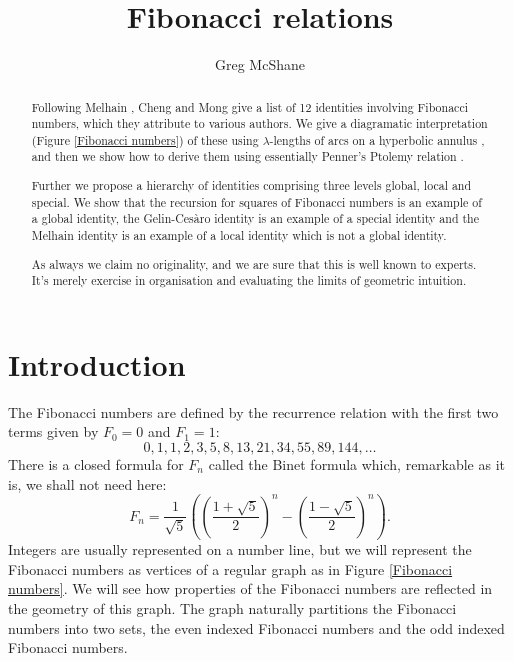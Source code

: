 \documentclass[12pt,a4paper]{amsart}
\title{Fibonacci relations}
\author[McShane]{Greg McShane}
\begin{document}
\maketitle

\begin{abstract} 


	Following Melhain \cite{melhain} , Cheng and Mong \cite{mong}
	give a list of 12 identities involving Fibonacci numbers,
	which they attribute to various authors. We give a
	diagramatic interpretation (Figure \ref{Fibonacci
	numbers}) of these using $\lambda$-lengths of arcs on a
	hyperbolic annulus  , and then we show how to derive them
	using essentially Penner's Ptolemy relation \cite{bob}.

	Further we propose a hierarchy of identities comprising
	three levels global, local and special. We show that the
	recursion for squares of Fibonacci numbers is an example
	of a global identity, the Gelin-Cesàro identity is an example of a special identity and the Melhain identity is an example of a local identity which is not a global identity.

As always we claim no originality, and we are sure that this is well
known to experts. It's merely exercise in organisation and evaluating the limits of geometric intuition.

\end{abstract} 

\section{Introduction}

The Fibonacci numbers are defined by the recurrence relation
with the first two terms given by $F_0 = 0$ and $F_1 = 1$:
$$0,1,1,2,3,5,8,13,21,34,55,89,144,\ldots$$
There is a closed formula for $F_n$ called the Binet formula which,
remarkable as it is, we shall not need here:
\begin{equation}
F_n = \frac{1}{\sqrt{5}}\left(\left(\frac{1+\sqrt{5}}{2}\right)^n
-
\left(\frac{1-\sqrt{5}}{2}\right)^n\right).\label{binet}
\end{equation}
Integers are usually represented on a number line, but we will
represent the Fibonacci numbers as vertices of a regular graph as in Figure
\ref{Fibonacci numbers}. We will see how properties of the Fibonacci
numbers are reflected in the geometry of this graph. 
The graph naturally partitions the Fibonacci numbers into two sets, the even indexed Fibonacci numbers and the odd indexed Fibonacci
numbers. 
\end{document}
